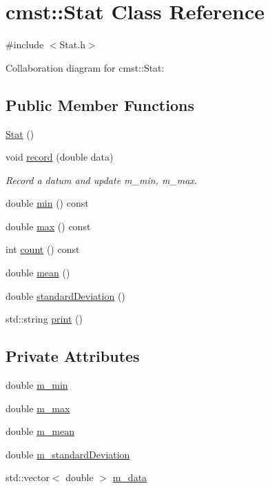\hypertarget{classcmst_1_1_stat}{}\section{cmst::Stat Class Reference}
\label{classcmst_1_1_stat}


{\ttfamily \#include $<$Stat.h$>$}



Collaboration diagram for cmst::Stat:
\subsection*{Public Member Functions}
\begin{DoxyCompactItemize}
\item 
\hyperlink{classcmst_1_1_stat_a1f07a880a815c7efe4e4d244fb0c6b7d}{Stat} ()
\item 
void \hyperlink{classcmst_1_1_stat_ab1e2fe7c367da505a6b5f1fb5eb619d2}{record} (double data)
\begin{DoxyCompactList}\small\item\em Record a datum and update m\_min, m\_max. \end{DoxyCompactList}\item 
double \hyperlink{classcmst_1_1_stat_a1a6a92dee526145fb289d79a94afe3ae}{min} () const 
\item 
double \hyperlink{classcmst_1_1_stat_ab42898f6611aa9f1ad028f99c3d4242a}{max} () const 
\item 
int \hyperlink{classcmst_1_1_stat_ab8c6707fa4739fda8b27a2481df25c35}{count} () const 
\item 
double \hyperlink{classcmst_1_1_stat_aa40d8d516e7f866146d91866d63faf2b}{mean} ()
\item 
double \hyperlink{classcmst_1_1_stat_abfbaefc3a4174643a2eb282251fd86a5}{standardDeviation} ()
\item 
std::string \hyperlink{classcmst_1_1_stat_a03d1a0f52e2ea72cfab11a426726aea4}{print} ()
\end{DoxyCompactItemize}
\subsection*{Private Attributes}
\begin{DoxyCompactItemize}
\item 
double \hyperlink{classcmst_1_1_stat_a2f503d58c0bc9eed8bd6d2c46edffbf4}{m\_min}
\item 
double \hyperlink{classcmst_1_1_stat_a93f52caf45b449d34c87fcbb0ebaa93e}{m\_max}
\item 
double \hyperlink{classcmst_1_1_stat_a0fc650572d2cea2bae2190188f3a03cf}{m\_mean}
\item 
double \hyperlink{classcmst_1_1_stat_aa6321c420c546603588be13de4628957}{m\_standardDeviation}
\item 
std::vector$<$ double $>$ \hyperlink{classcmst_1_1_stat_a8c6fad792b12d961df5ea2b091cb39f4}{m\_data}
\end{DoxyCompactItemize}


